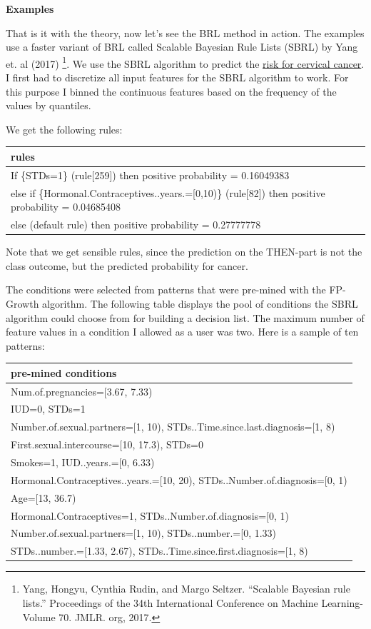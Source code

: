 \documentclass[
  12pt,
]{krantz}
\begin{document}
\textbf{Examples}

That is it with the theory, now let's see the BRL method in action.
The examples use a faster variant of BRL called Scalable Bayesian Rule Lists (SBRL) by Yang et. al (2017) \footnote{Yang, Hongyu, Cynthia Rudin, and Margo Seltzer. ``Scalable Bayesian rule lists.'' Proceedings of the 34th International Conference on Machine Learning-Volume 70. JMLR. org, 2017.}.
We use the SBRL algorithm to predict the \protect\hyperlink{cervical}{risk for cervical cancer}.
I first had to discretize all input features for the SBRL algorithm to work.
For this purpose I binned the continuous features based on the frequency of the values by quantiles.

We get the following rules:

\begin{tabular}{>{\raggedright\arraybackslash}p{10cm}}
\hline
rules\\
\hline
If      \{STDs=1\} (rule[259]) then positive probability = 0.16049383\\
\hline
else if \{Hormonal.Contraceptives..years.=[0,10)\} (rule[82]) then positive probability = 0.04685408\\
\hline
else  (default rule)  then positive probability = 0.27777778\\
\hline
\end{tabular}

Note that we get sensible rules, since the prediction on the THEN-part is not the class outcome, but the predicted probability for cancer.

The conditions were selected from patterns that were pre-mined with the FP-Growth algorithm.
The following table displays the pool of conditions the SBRL algorithm could choose from for building a decision list.
The maximum number of feature values in a condition I allowed as a user was two.
Here is a sample of ten patterns:

\begin{tabular}{>{\raggedright\arraybackslash}p{10cm}}
\hline
pre-mined conditions\\
\hline
Num.of.pregnancies=[3.67, 7.33)\\
\hline
IUD=0, STDs=1\\
\hline
Number.of.sexual.partners=[1, 10), STDs..Time.since.last.diagnosis=[1, 8)\\
\hline
First.sexual.intercourse=[10, 17.3), STDs=0\\
\hline
Smokes=1, IUD..years.=[0, 6.33)\\
\hline
Hormonal.Contraceptives..years.=[10, 20), STDs..Number.of.diagnosis=[0, 1)\\
\hline
Age=[13, 36.7)\\
\hline
Hormonal.Contraceptives=1, STDs..Number.of.diagnosis=[0, 1)\\
\hline
Number.of.sexual.partners=[1, 10), STDs..number.=[0, 1.33)\\
\hline
STDs..number.=[1.33, 2.67), STDs..Time.since.first.diagnosis=[1, 8)\\
\hline
\end{tabular}
\end{document}

